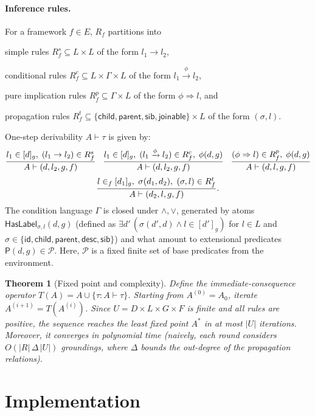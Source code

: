\documentclass{IOS-Book-Article}
\newtheorem{theorem}{Theorem}[section]
\begin{document}
\paragraph{Inference rules.}
For a framework $f \in E$, $R_f$ partitions into \begin{enumerate*}[label=(\roman*)] \item simple rules $R_f^s\subseteq L\times L$ of the form $l_1\to l_2$, \item conditional rules $R_f^c\subseteq L\times\Gamma\times L$ of the form $l_1\xrightarrow{\phi} l_2$, \item pure implication rules $R_f^p\subseteq\Gamma\times L$ of the form $\phi\Rightarrow l$, and \item propagation rules $R_f^t\subseteq\{\textsf{child},\textsf{parent},\textsf{sib},\textsf{joinable}\}\times L$ of the form $(\sigma,l)$.\end{enumerate*} One-step derivability $A\vdash\tau$ is given by:
\[
\footnotesize
\frac{l_1\in[d]_g,\ (l_1\to l_2)\in R_f^s}{A\vdash(d,l_2,g,f)}\quad
\frac{l_1\in[d]_g,\ (l_1\xrightarrow{\phi} l_2)\in R_f^c,\ \phi(d,g)}{A\vdash(d,l_2,g,f)}\quad
\frac{(\phi\Rightarrow l)\in R_f^p,\ \phi(d,g)}{A\vdash(d,l,g,f)}
\]
\[
\small
\frac{l\in_f[d_1]_g,\ \sigma(d_1,d_2),\ (\sigma,l)\in R_f^t}{A\vdash(d_2,l,g,f)}.
\]
The condition language $\Gamma$ is closed under $\land,\lor$, generated by atoms $\textsf{HasLabel}_{\sigma,l}(d,g)$ (defined as $\exists d'\,(\sigma(d',d)\wedge l\in[d']_g)$ for $l\in L$ and $\sigma\in\{\textsf{id},\textsf{child},\textsf{parent},\textsf{desc},\textsf{sib}\}$) and what amount to extensional predicates $\textsf{P}(d,g)\in\mathcal{P}$. Here, $\mathcal{P}$ is a fixed finite set of base predicates from the environment.

\begin{theorem}[Fixed point and complexity]\label{thm:convergence}
Define the immediate-consequence operator $T(A)=A\cup\{\tau: A\vdash\tau\}$. Starting from $A^{(0)}=A_0$, iterate $A^{(i+1)}=T(A^{(i)})$. Since $U=D\times L\times G\times F$ is finite and all rules are positive, the sequence reaches the least fixed point $A^*$ in at most $|U|$ iterations. Moreover, it converges in polynomial time (naively, each round considers $O(|R|\,\Delta\,|U|)$ groundings, where $\Delta$ bounds the out-degree of the propagation relations).
\end{theorem}


\section{Implementation}\label{sec:implementation}
\end{document}
